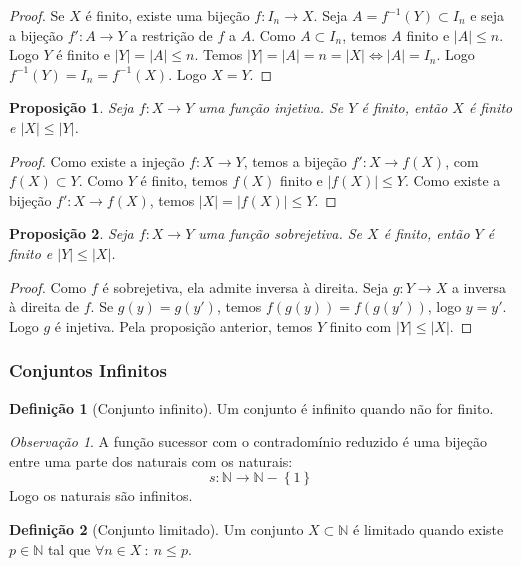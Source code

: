 \documentclass{article}
\newtheorem{prop}{Proposição}[section]
\theoremstyle{theorem}
\theoremstyle{lemma}
\theoremstyle{definition}
\newtheorem{definicao}{Definição}[section]
\theoremstyle{remark}
\newtheorem{obs}{Observação}[section]
\begin{document}
\begin{proof}
	Se $X$ é finito, existe uma bijeção $f : I_n \to X$. Seja $A = f^{-1}(Y) \subset I_n$ e seja a bijeção $f': A \to Y$ a restrição de $f$ a $A$.  Como $A\subset I_n$, temos $A$ finito e $|A| \leq n$. Logo $Y$ é finito e  $|Y| = |A| \leq n$.  Temos $|Y| = |A| = n  = |X| \iff |A| = I_n$. Logo $f^{-1}(Y) = I_n = f^{-1}(X)$. Logo $X = Y$.
\end{proof}
\begin{prop}
	Seja $f:X\to Y$ uma função injetiva. Se $Y$ é finito, então $X$ é finito e $|X|\leq |Y|$.
\end{prop}
\begin{proof}
	Como existe a injeção $f: X\to Y$, temos a bijeção $f': X \to f(X)$,  com $f(X)\subset Y$. Como $Y$ é finito, temos $f(X)$ finito e  $|f(X)| \leq Y$. Como existe a bijeção $f':X\to f(X)$, temos $|X| = |f(X)| \leq Y$.
\end{proof}
\begin{prop}
	Seja $f:X\to Y$ uma função sobrejetiva. Se $X$ é finito, então $Y$ é finito e $|Y|\leq |X|$.
\end{prop}
\begin{proof}
	Como $f$ é sobrejetiva, ela admite inversa à direita. Seja $g: Y\to X$ a inversa à direita de $f$.  Se $g(y) = g(y')$, temos $f(g(y)) = f(g(y'))$, logo $y = y'$. Logo $g$ é injetiva. Pela proposição anterior, temos $Y$ finito com $|Y| \leq |X|$. 
\end{proof}
\subsubsection{Conjuntos Infinitos}
\begin{definicao}[Conjunto infinito]
	Um conjunto é infinito quando não for finito.
\end{definicao}
\begin{obs}
	A função sucessor com o contradomínio reduzido é uma bijeção entre uma parte dos naturais com os naturais:
	$$s: \mathbb{N} \to \mathbb{N} - \left\{1\right\}$$
	Logo os naturais são infinitos.
\end{obs}
\begin{definicao}[Conjunto limitado]
	Um conjunto $X\subset \mathbb{N}$ é limitado quando existe $p\in \mathbb{N}$ tal que $\forall n\in X \: : \: n \leq p$.
\end{definicao}

%
\end{document}
